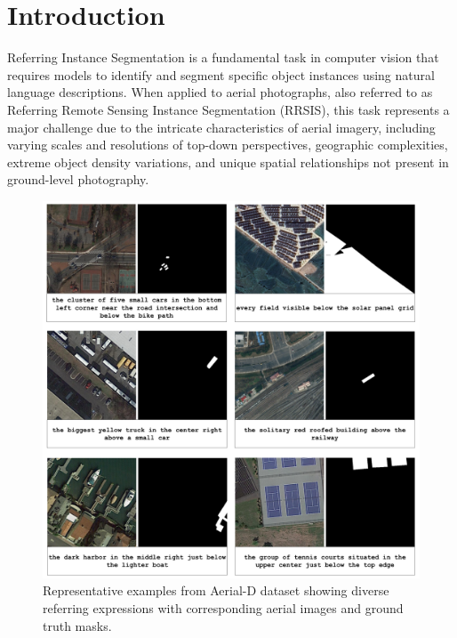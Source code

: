 
\section{Introduction}
\label{sec:intro}

Referring Instance Segmentation is a fundamental task in computer vision that requires models to identify and segment specific object instances using natural language descriptions. When applied to aerial photographs, also referred to as Referring Remote Sensing Instance Segmentation (RRSIS), this task represents a major challenge due to the intricate characteristics of aerial imagery, including varying scales and resolutions of top-down perspectives, geographic complexities, extreme object density variations, and unique spatial relationships not present in ground-level photography.

\begin{figure}[H]
\centering
\includegraphics[width=\columnwidth]{./images/6samples.png}
\caption{Representative examples from Aerial-D dataset showing diverse referring expressions with corresponding aerial images and ground truth masks.}
\label{fig:dataset_examples}
\end{figure}

